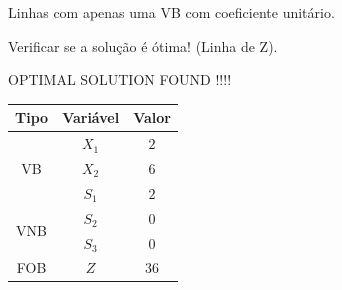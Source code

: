 \begin{frame}
\begin{columns}
\begin{column}{0.5\textwidth}
{\begin{mdframed}[backgroundcolor=orange!80]
			\end{mdframed}
			Linhas com apenas uma VB com coeficiente unitário.
		}		
		{
			\begin{mdframed}[backgroundcolor=olive!80]
				Verificar se a solução é ótima! (Linha de Z).
			\end{mdframed}
		}
		{
			\begin{mdframed}[backgroundcolor=red!80]
				\centering
				OPTIMAL SOLUTION FOUND !!!!
			\end{mdframed}
		}
		{
			\begin{table}
				\begin{tabular}{ c | c | c |}
					\hline
					\cellcolor{blue!100} \color{white}\scriptsize Tipo     & 
					\cellcolor{blue!100} \color{white} \scriptsize Variável &  
					\cellcolor{blue!100} \color{white} \scriptsize Valor \\
					\hline
					\cellcolor{green!100} \multirow{3}{1cm}{VB}  & 
					\cellcolor{green!100} $\scriptstyle X_1$   &  
					\cellcolor{green!100} $\scriptstyle 2$   \\
					\cellcolor{green!100} VB & \cellcolor{green!100} $\scriptstyle X_2$   &  
					\cellcolor{green!100} $\scriptstyle 6$   \\
					\cellcolor{green!100} & \cellcolor{green!100} $\scriptstyle S_1$   &  
					\cellcolor{green!100} $\scriptstyle 2$   \\
					\multirow{2}{1cm}{ VNB} & 
					$\scriptstyle S_2$   &  
					$\scriptstyle 0$   \\
					& $\scriptstyle S_3$   &  
					$\scriptstyle 0$   \\
					\cellcolor{green!100}FOB 				 & 
					\cellcolor{green!100} $\scriptstyle Z$     &  
					\cellcolor{green!100} $\scriptstyle 36$  \\
					\hline		
				\end{tabular}
			\end{table}
		}


\end{column}
\end{columns}
\end{frame}
